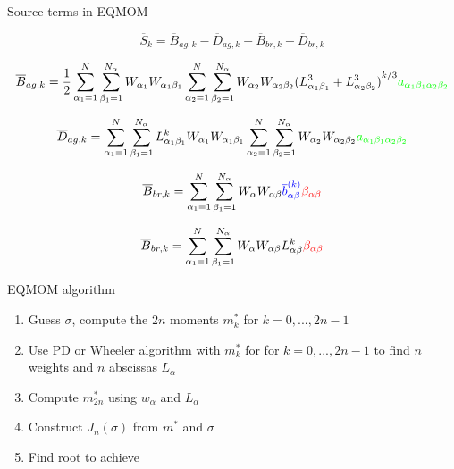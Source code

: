 \documentclass{beamer}
\begin{document}
\begin{frame}{Source terms in EQMOM}

\begin{equation*}
\overline{S}_k =\overline{B}_{ag,k}-\overline{D}_{ag,k} +\overline{B}_{br,k}-\overline{D}_{br,k} 
\end{equation*}

\begin{equation*}
\overline{B}_{ag,k} =\frac{1}{2}\sum_{\alpha_1=1}^{N}\sum_{\beta_1=1}^{N_{\alpha}} W_{\alpha_1} W_{\alpha_1 \beta_1} \sum_{\alpha_2=1}^{N}\sum_{\beta_2=1}^{N_{\alpha}} W_{\alpha_2} W_{\alpha_2 \beta_2}  {(L_{\alpha_1\beta_1}^3+L_{\alpha_2\beta_2}^3)}^{k/3} \textcolor{green}{a_{\alpha_1\beta_1\alpha_2\beta_2}}
\end{equation*}

\begin{equation*}
\overline{D}_{ag,k} =\sum_{\alpha_1=1}^{N}\sum_{\beta_1=1}^{N_{\alpha}} L^k_{\alpha_1\beta_1} W_{\alpha_1} W_{\alpha_1 \beta_1} \sum_{\alpha_2=1}^{N}\sum_{\beta_2=1}^{N_{\alpha}} W_{\alpha_2} W_{\alpha_2 \beta_2} \textcolor{green}{a_{\alpha_1\beta_1\alpha_2\beta_2}}
\end{equation*}

\begin{equation*}
\overline{B}_{br,k} =\sum_{\alpha_1=1}^{N}\sum_{\beta_1=1}^{N_{\alpha}} W_{\alpha} W_{\alpha \beta} \textcolor{blue}{\overline{b}^{(k)}_{\alpha \beta}} \textcolor{red}{\beta_{\alpha \beta}}
\end{equation*}

\begin{equation*}
\overline{B}_{br,k} =\sum_{\alpha_1=1}^{N}\sum_{\beta_1=1}^{N_{\alpha}} W_{\alpha} W_{\alpha \beta} L^k_{\alpha\beta} \textcolor{red}{\beta_{\alpha \beta}} 
\end{equation*}

\end{frame}

\begin{frame}{EQMOM algorithm}

\begin{enumerate}
\item Guess $\sigma$, compute the $2n$ moments $m_k^{*}$ for $k=0,...,2n-1$
\item Use PD or Wheeler algorithm with $m_k^{*}$ for for $k=0,...,2n-1$ to find $n$ weights and $n$ abscissas $L_{\alpha}$
\item Compute $m_{2n}^*$ using $w_{\alpha}$ and $L_{\alpha}$
\item Construct $J_n(\sigma)$ from $m^{*}$ and $\sigma$
\item Find root to achieve 
\end{enumerate}

 
\end{frame}
\end{document}
